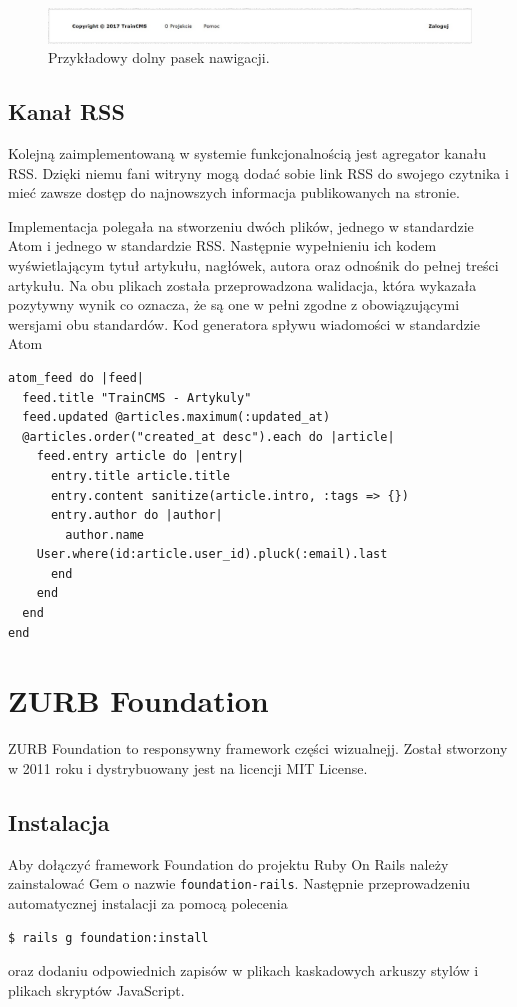 \documentclass[openright]{xmgr}
\begin{document}
\begin{figure}[!tbh]
\centering
\includegraphics[width=\linewidth]{fig/footbar}
\caption{Przykładowy dolny pasek nawigacji.}
\end{figure}

\newpage

\subsection{Kanał RSS}
Kolejną zaimplementowaną w systemie funkcjonalnością jest agregator kanału RSS. Dzięki niemu fani witryny mogą dodać sobie link RSS do swojego czytnika i mieć zawsze dostęp do najnowszych informacja publikowanych na stronie.

Implementacja polegała na stworzeniu dwóch plików, jednego w standardzie Atom i jednego w standardzie RSS. Następnie wypełnieniu ich kodem wyświetlającym tytuł artykułu, nagłówek, autora oraz odnośnik do pełnej treści artykułu. Na obu plikach została przeprowadzona walidacja, która wykazała pozytywny wynik co oznacza, że są one w pełni zgodne z obowiązującymi wersjami obu standardów.
Kod generatora spływu wiadomości w standardzie Atom

\begin{lstlisting}[language=ruby2, caption={Kod generatora spływu wiadomości w standardzie Atom}]
atom_feed do |feed|
  feed.title "TrainCMS - Artykuly"
  feed.updated @articles.maximum(:updated_at)
  @articles.order("created_at desc").each do |article|
    feed.entry article do |entry|
      entry.title article.title
      entry.content sanitize(article.intro, :tags => {})
      entry.author do |author|
        author.name
	User.where(id:article.user_id).pluck(:email).last
      end
    end
  end
end
\end{lstlisting}

\newpage

\section{ZURB Foundation}
ZURB Foundation \cite{foundation} to responsywny framework części wizualnejj. Został stworzony w 2011 roku i dystrybuowany jest na licencji MIT License.

\subsection{Instalacja}
Aby dołączyć framework Foundation do projektu Ruby On Rails należy zainstalować Gem o nazwie \texttt{foundation-rails}. Następnie przeprowadzeniu automatycznej instalacji za pomocą polecenia
\begin{lstlisting}[language=html, caption={Kod instalujący Foundation w naszym projekcie}]
$ rails g foundation:install
\end{lstlisting}
oraz dodaniu odpowiednich zapisów w plikach kaskadowych arkuszy stylów i plikach skryptów JavaScript.
\end{document}

